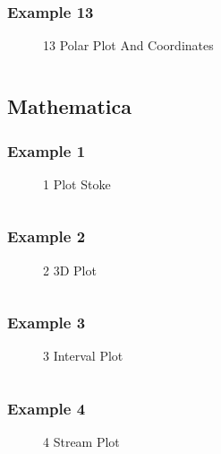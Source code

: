 \documentclass[
  hyper,    
  lang=cn,
  class=book,
  bib_index={load},
  mathSpec={envStyle=leftbar, alias},
  toc={column=2, title=目录},
]{zlatex}
\begin{document}
\subsubsection{Example 13}
\begin{figure}[!htb]
    \centering
    
    \caption{13 Polar Plot And Coordinates}
    \label{fig:13-polar-plot}
\end{figure}
\inputminted{latex}{./example_13.tex}
\newpage


\subsection{Mathematica}
\subsubsection{Example 1}
\begin{figure}[!htb]
    \centering
    
    \caption{1 Plot Stoke}
    \label{fig:1-plot-stoke}
\end{figure}
\inputminted{mathematica}{./example_1.wls}
\newpage


\subsubsection{Example 2}
\begin{figure}[!htb]
    \centering
    
    \caption{2 3D Plot}
    \label{fig:2-3d-plot}
\end{figure}
\inputminted{mathematica}{./example_2.wls}
\newpage


\subsubsection{Example 3}
\begin{figure}[!htb]
    \centering
    
    \caption{3 Interval Plot}
    \label{fig:3-interval-plot}
\end{figure}
\inputminted{mathematica}{./example_3.wls}
\newpage


\subsubsection{Example 4}
\begin{figure}[!htb]
    \centering
    
    \caption{4 Stream Plot}
    \label{fig:4-stream-plot}
\end{figure}
\inputminted{mathematica}{./example_4.wls}
\newpage
\end{document}
